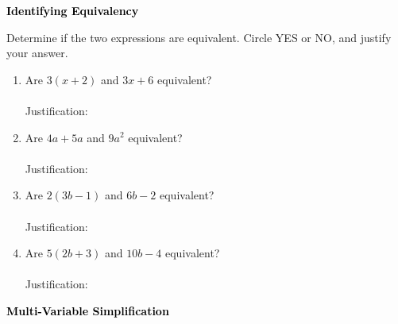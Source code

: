 \documentclass[12pt, letterpaper, fleqn]{article}
\newcommand{\blanklong}{\underline{\hspace{6.5cm}}}
\begin{document}
\newpage

\begin{tcolorbox}[colback=black!10]
\large\textcolor{black}{\textbf{Identifying Equivalency}}
\end{tcolorbox}

\noindent
Determine if the two expressions are equivalent. Circle YES or NO, and justify your answer.

\vspace{3mm}

\begin{enumerate}[itemsep=1.5cm, leftmargin=0.6cm]

\item Are $3(x + 2)$ \quad and \quad $3x + 6$ equivalent? \quad {} \quad {} \\ \\
Justification: \blanklong

\vspace{1.5cm}

\item Are $4a + 5a$ \quad and \quad $9a^2$ equivalent? \quad {} \quad {} \\ \\
Justification: \blanklong

\vspace{1.5cm}

\item Are $2(3b - 1)$ \quad and \quad $6b - 2$ equivalent? \quad {} \quad {} \\ \\
Justification: \blanklong

\vspace{1.5cm}

\item Are $5(2b + 3)$ \quad and \quad $10b - 4$ equivalent? \quad {} \quad {} \\ \\
Justification: \blanklong

\vspace{1.5cm}

\end{enumerate}

\newpage

\begin{tcolorbox}[colback=black!10]
\large\textcolor{black}{\textbf{Multi-Variable Simplification}}
\end{tcolorbox}
\end{document}
